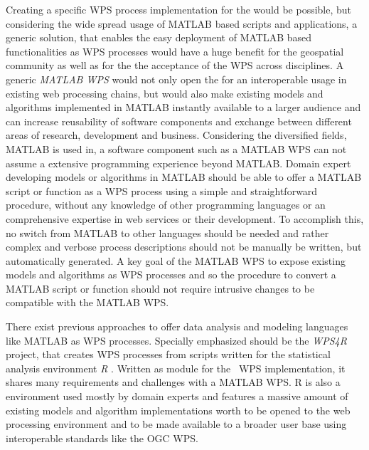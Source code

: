 	Creating a specific \ac{WPS} process implementation for the \la would be possible, but considering the wide spread usage of MATLAB based scripts and applications, a generic solution, that enables the easy deployment of MATLAB based functionalities as \acl{WPS} processes would have a huge benefit for the geospatial community as well as for the the acceptance of the \ac{WPS} across disciplines. A generic \emph{MATLAB WPS} would not only open the \la for an interoperable usage in existing web processing chains, but would also make existing models and algorithms implemented in MATLAB instantly available to a larger audience and can increase reusability of software components and exchange between different areas of research, development and business.
	Considering the diversified fields, MATLAB is used in, a software component such as a MATLAB WPS can not assume a extensive programming experience beyond MATLAB. Domain expert developing models or algorithms in MATLAB should be able to offer a MATLAB script or function as a \ac{WPS} process using a simple and straightforward procedure, without any knowledge of other programming languages or an comprehensive expertise in web services or their development. To accomplish this, no switch from MATLAB to other languages should be needed and rather complex and verbose process descriptions should not be manually be written, but automatically generated. A key goal of the MATLAB WPS to expose existing models and algorithms as \ac{WPS} processes and so the procedure to convert a MATLAB script or function should not require intrusive changes to be compatible with the MATLAB WPS.

	There exist previous approaches to offer data analysis and modeling languages like MATLAB as \ac{WPS} processes. Specially emphasized should be the \emph{WPS4R} \citep{wps4r} project, that creates WPS processes from scripts written for the statistical analysis environment \emph{R} \citep{gnur}. Written as module for the \ftn~\ac{WPS} implementation, it shares many requirements and challenges with a MATLAB WPS. R is also a environment used mostly by domain experts and features a massive amount of existing models and algorithm implementations worth to be opened to the web processing environment and to be made available to a broader user base using interoperable standards like the \ac{OGC} \acl{WPS}.

	


